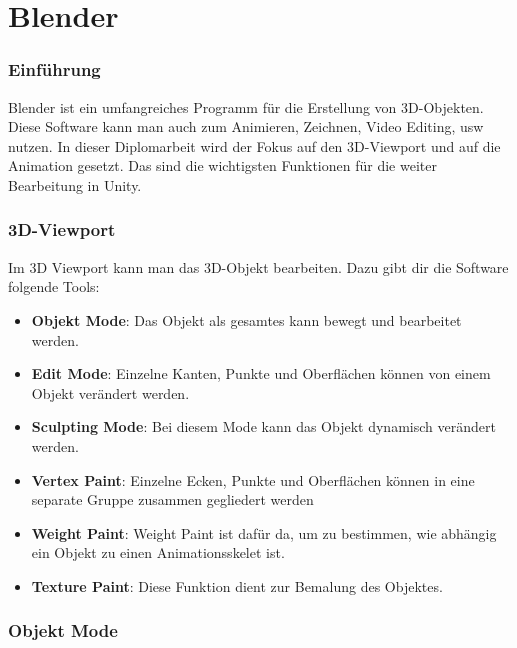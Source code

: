 \pagebreak
{}
\chapter{Blender}

\subsection{Einführung}
Blender ist ein umfangreiches Programm für die Erstellung von 3D-Objekten. Diese Software kann man auch zum Animieren, Zeichnen, Video Editing, usw nutzen. 
In dieser Diplomarbeit wird der Fokus auf den 3D-Viewport und auf die Animation gesetzt. Das sind die wichtigsten Funktionen für die weiter Bearbeitung in Unity. 

\subsection{3D-Viewport}
Im 3D Viewport kann man das 3D-Objekt bearbeiten. Dazu gibt dir die Software folgende Tools: 

\begin{itemize}
    \item \textbf{Objekt Mode}:
    \indent Das Objekt als gesamtes kann bewegt und bearbeitet werden. 
    \item \textbf{Edit Mode}:
    \indent Einzelne Kanten, Punkte und Oberflächen können von einem Objekt verändert werden. 
    \item \textbf{Sculpting Mode}:
    \indent Bei diesem Mode kann das Objekt dynamisch verändert werden.
    \item \textbf{Vertex Paint}:
    \indent Einzelne Ecken, Punkte und Oberflächen können in eine separate Gruppe zusammen gegliedert werden
    \item \textbf{Weight Paint}: 
    \indent Weight Paint ist dafür da, um zu bestimmen, wie abhängig ein Objekt zu einen Animationsskelet ist. 
    \item \textbf{Texture Paint}:
    \indent Diese Funktion dient zur Bemalung des Objektes.
\end{itemize}

\pagebreak

\subsection{Objekt Mode}

